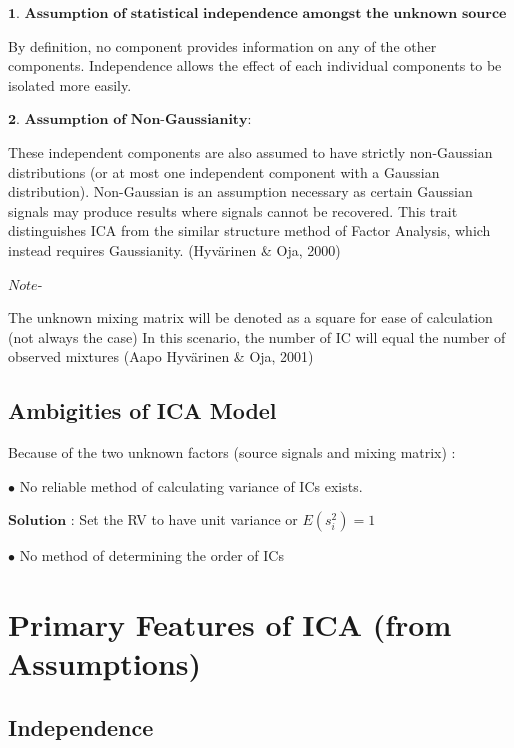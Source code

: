 \documentclass[12pt,twoside]{amherstthesis}
\begin{document}
  \(\textbf{1. Assumption of statistical independence amongst the unknown source components}\)
  
  By definition, no component provides information on any of the other
  components. Independence allows the effect of each individual components
  to be isolated more easily.
  
  \(\textbf{2. Assumption of Non-Gaussianity}\):
  
  These independent components are also assumed to have strictly
  non-Gaussian distributions (or at most one independent component with a
  Gaussian distribution). Non-Gaussian is an assumption necessary as
  certain Gaussian signals may produce results where signals cannot be
  recovered. This trait distinguishes ICA from the similar structure
  method of Factor Analysis, which instead requires Gaussianity.
  (Hyvärinen \& Oja, 2000)
  
  \(\textit{Note}\)-
  
  The unknown mixing matrix will be denoted as a square for ease of
  calculation (not always the case) In this scenario, the number of IC
  will equal the number of observed mixtures (Aapo Hyvärinen \& Oja, 2001)
  
  \subsection{Ambigities of ICA Model}\label{ambigities-of-ica-model}
  
  Because of the two unknown factors (source signals and mixing matrix) :
  
  \(\bullet\) No reliable method of calculating variance of ICs exists.
  \newline
  
  \(\textbf{Solution}\) : Set the RV to have unit variance or
  \(E(s_i^2) = 1\) \newline
  
  \(\bullet\) No method of determining the order of ICs \newline
  
  \section{Primary Features of ICA (from
  Assumptions)}\label{primary-features-of-ica-from-assumptions}
  
  \subsection{Independence}\label{independence}
  
\end{document}
